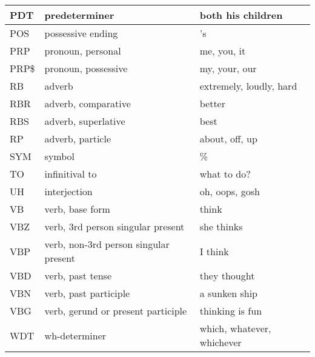 \begin{table}[!ht]
{\begin{tabular}{|l|l|l|}
            PDT          & predeterminer                             & both his children          \\ \hline
            POS          & possessive ending                         & 's                         \\ \hline
            PRP          & pronoun, personal                         & me, you, it                \\ \hline
            PRP\$        & pronoun, possessive                       & my, your, our              \\ \hline
            RB           & adverb                                    & extremely, loudly, hard    \\ \hline
            RBR          & adverb, comparative                       & better                     \\ \hline
            RBS          & adverb, superlative                       & best                       \\ \hline
            RP           & adverb, particle                          & about, off, up             \\ \hline
            SYM          & symbol                                    & \%                         \\ \hline
            TO           & infinitival to                            & what to do?                \\ \hline
            UH           & interjection                              & oh, oops, gosh             \\ \hline
            VB           & verb, base form                           & think                      \\ \hline
            VBZ          & verb, 3rd person singular present         & she thinks                 \\ \hline
            VBP          & verb, non-3rd person singular present     & I think                    \\ \hline
            VBD          & verb, past tense                          & they thought               \\ \hline
            VBN          & verb, past participle                     & a sunken ship              \\ \hline
            VBG          & verb, gerund or present participle        & thinking is fun            \\ \hline
            WDT          & wh-determiner                             & which, whatever, whichever \\ \hline

\end{tabular}}
\end{table}
